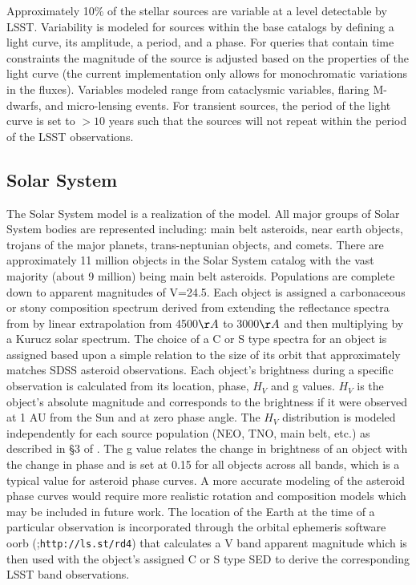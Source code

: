\documentclass[11pt]{article}
\begin{document}
Approximately 10\% of the stellar sources are variable at a level
detectable by LSST.  Variability is modeled for sources within the
base catalogs by defining a light curve, its amplitude, a period, and
a phase. For queries that contain time constraints the magnitude of
the source is adjusted based on the properties of the light curve (the
current implementation only allows for monochromatic variations in the
fluxes). Variables modeled range from cataclysmic variables, flaring
M-dwarfs, and micro-lensing events. For transient sources, the period
of the light curve is set to $>10$ years such that the sources will
not repeat within the period of the LSST observations.


\subsection{Solar System \label{sec:ssm}}

The Solar System model is a realization of the \citet{grav11} model.
All major groups of Solar System bodies are represented including:
main belt asteroids, near earth objects, trojans of the major planets,
trans-neptunian objects, and comets. There are approximately 11
million objects in the Solar System catalog with the vast majority (about 9 million) being
main belt asteroids. Populations are complete down to apparent
magnitudes of V=24.5.  Each object is assigned a carbonaceous or stony
composition spectrum derived from extending the reflectance spectra
from \citet{demeo} by linear extrapolation from 4500$\AA$ to 3000$\AA$
and then multiplying by a Kurucz solar spectrum. The choice of a
C or S type spectra for an object is assigned based upon a simple
relation to the size of its orbit that approximately matches SDSS
asteroid observations. Each object's brightness during a specific
observation is calculated from its location, phase, $H_V$ and g
values. $H_V$ is the object's absolute magnitude and corresponds to the
brightness if it were observed at 1 AU from the Sun and at zero phase
angle.  The $H_V$ distribution is modeled independently for each
source population (NEO, TNO, main belt, etc.)  as described in \S 3 of
\citet{grav11}.  The g value relates the change in brightness of an
object with the change in phase and is set at 0.15 for all objects
across all bands, which is a typical value for asteroid phase curves.
A more accurate modeling of the asteroid phase curves would require
more realistic rotation and composition models which may be included
in future work.  The location of the Earth at the time of a
particular observation is incorporated through the orbital ephemeris software oorb
(\citet{granvik};{\tt http://ls.st/rd4}) that calculates a V
band apparent magnitude which is then used with the object's assigned
C or S type SED to derive the corresponding LSST band observations.
\end{document}

